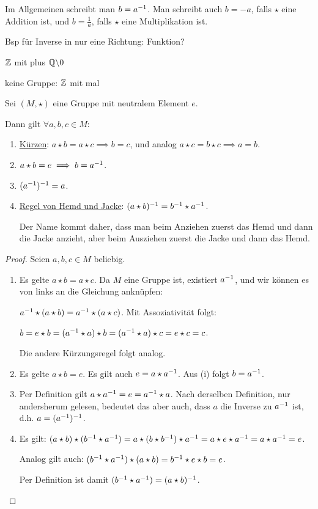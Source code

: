 Im Allgemeinen schreibt man $b = a^{-1}$. Man schreibt auch $b = -a$, falls $\star$ eine Addition ist, und $b = \frac{1}{a}$, falls $\star$ eine Multiplikation ist.

\begin{example}
    Bsp für Inverse in nur eine Richtung: Funktion?
    
    $\mathbb{Z}$ mit plus
    $\mathbb{Q} \backslash 0$

    keine Gruppe: $\mathbb{Z}$ mit mal
\end{example}

\begin{lemma}
    \label{lem-rechenregeln-gruppe}
    Sei $(M, \star)$ eine Gruppe mit neutralem Element $e$.
    
    Dann gilt $\forall a, b, c \in M$:
    \begin{enumerate}
        \item \underline{Kürzen}: $a \star b = a \star c \implies b = c$, und analog $a \star c = b \star c \implies a = b$.
        \item $a \star b = e \implies b = a^{-1}$.
        \item $(a^{-1})^{-1} = a$.
        \item \underline{Regel von Hemd und Jacke}: $(a \star b)^{-1} = b^{-1} \star a^{-1}$.

        Der Name kommt daher, dass man beim Anziehen zuerst das Hemd und dann die Jacke anzieht, aber beim Ausziehen zuerst die Jacke und dann das Hemd.
    \end{enumerate}
\end{lemma}
\begin{proof}
    Seien $a, b, c \in M$ beliebig.
    \begin{enumerate}
        \item Es gelte $a \star b = a \star c$. Da $M$ eine Gruppe ist, existiert $a^{-1}$, und wir können es von links an die Gleichung anknüpfen:

        $a^{-1} \star (a \star b) = a^{-1} \star (a \star c)$. Mit Assoziativität folgt:

        $b = e \star b = (a^{-1} \star a) \star b = (a^{-1} \star a) \star c = e \star c = c$.

        Die andere Kürzungsregel folgt analog.
        \item Es gelte $a \star b = e$. Es gilt auch $e = a \star a^{-1}$. Aus (i) folgt $b = a^{-1}$.
        \item Per Definition gilt $a \star a^{-1} = e = a^{-1} \star a$. Nach derselben Definition, nur andersherum gelesen, bedeutet das aber auch, dass $a$ die Inverse zu $a^{-1}$ ist, d.h. $a = (a^{-1})^{-1}$.
        \item Es gilt: $(a \star b) \star (b^{-1} \star a^{-1}) = a \star (b \star b^{-1}) \star a^{-1} = a \star e \star a^{-1} = a \star a^{-1} = e$.

        Analog gilt auch: $(b^{-1} \star a^{-1}) \star (a \star b) = b^{-1} \star e \star b = e$.

        Per Definition ist damit $(b^{-1} \star a^{-1}) = (a \star b)^{-1}$.
    \end{enumerate}
\end{proof}

